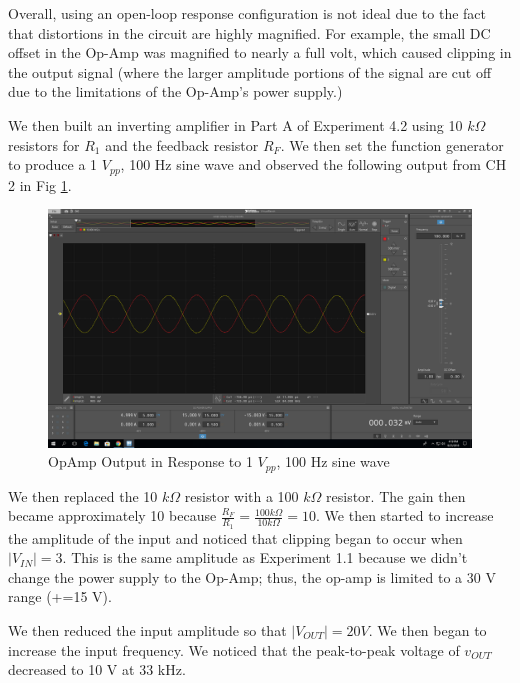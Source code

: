 \documentclass[10pt]{article}
\begin{document}
\quad Overall, using an open-loop response configuration is not ideal due to the fact that distortions in the circuit are highly magnified. For example, the small DC offset in the Op-Amp was magnified to nearly a full volt, which caused clipping in the output signal (where the larger amplitude portions of the signal are cut off due to the limitations of the Op-Amp's power supply.)

\quad We then built an inverting amplifier in Part A of Experiment 4.2 using 10 $k\Omega$ resistors for $R_1$ and the feedback resistor $R_F$. We then set the function generator to produce a 1 $V_{pp}$, 100 Hz sine wave and observed the following output from CH 2 in Fig \ref{fig:invertingamp}. 

\begin{centering}
	\begin{figure} [H]
		\centering
		\includegraphics[scale=0.22]{images/invertingamplifier.png}
		\caption{OpAmp Output in Response to 1 $V_{pp}$, 100 Hz sine wave}				\label{fig:invertingamp}
	\end{figure}
\end{centering}

We then replaced the 10 $k\Omega$ resistor with a 100 $k\Omega$ resistor. The gain then became approximately 10 because $\frac{R_F}{R_1} = \frac{100k\Omega}{10k\Omega} = 10$. We then started to increase the amplitude of the input and noticed that clipping began to occur when $|V_{IN}| = 3$. This is the same amplitude as Experiment 1.1 because we didn't change the power supply to the Op-Amp; thus, the op-amp is limited to a 30 V range (+=15 V).

We then reduced the input amplitude so that $|V_{OUT}| = 20V$. We then began to increase the input frequency. We noticed that the peak-to-peak voltage of $v_{OUT}$ decreased to 10 V at 33 kHz. 
\end{document}
